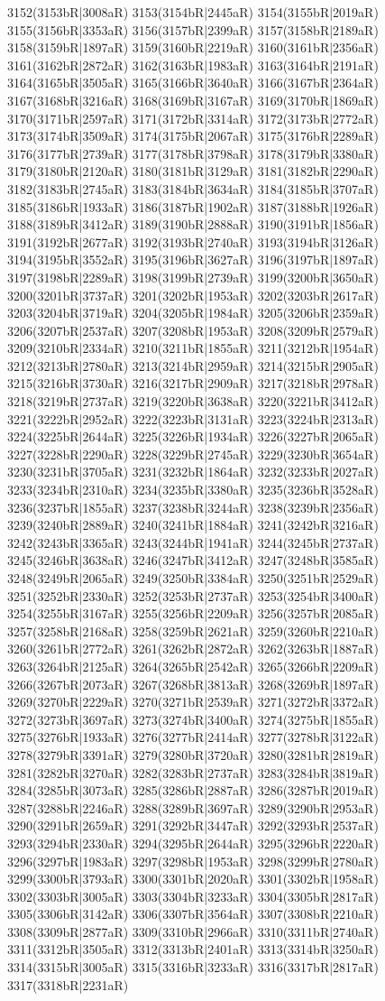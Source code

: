 3152(3153bR|3008aR) 3153(3154bR|2445aR) 3154(3155bR|2019aR) 3155(3156bR|3353aR) 3156(3157bR|2399aR) 3157(3158bR|2189aR) 3158(3159bR|1897aR) 3159(3160bR|2219aR) 3160(3161bR|2356aR) 3161(3162bR|2872aR) 3162(3163bR|1983aR) 3163(3164bR|2191aR) 3164(3165bR|3505aR) 3165(3166bR|3640aR) 3166(3167bR|2364aR) 3167(3168bR|3216aR) 3168(3169bR|3167aR) 3169(3170bR|1869aR) 3170(3171bR|2597aR) 3171(3172bR|3314aR) 3172(3173bR|2772aR) 3173(3174bR|3509aR) 3174(3175bR|2067aR) 3175(3176bR|2289aR) 3176(3177bR|2739aR) 3177(3178bR|3798aR) 3178(3179bR|3380aR) 3179(3180bR|2120aR) 3180(3181bR|3129aR) 3181(3182bR|2290aR) 3182(3183bR|2745aR) 3183(3184bR|3634aR) 3184(3185bR|3707aR) 3185(3186bR|1933aR) 3186(3187bR|1902aR) 3187(3188bR|1926aR) 3188(3189bR|3412aR) 3189(3190bR|2888aR) 3190(3191bR|1856aR) 3191(3192bR|2677aR) 3192(3193bR|2740aR) 3193(3194bR|3126aR) 3194(3195bR|3552aR) 3195(3196bR|3627aR) 3196(3197bR|1897aR) 3197(3198bR|2289aR) 3198(3199bR|2739aR) 3199(3200bR|3650aR) 3200(3201bR|3737aR) 3201(3202bR|1953aR) 3202(3203bR|2617aR) 3203(3204bR|3719aR) 3204(3205bR|1984aR) 3205(3206bR|2359aR) 3206(3207bR|2537aR) 3207(3208bR|1953aR) 3208(3209bR|2579aR) 3209(3210bR|2334aR) 3210(3211bR|1855aR) 3211(3212bR|1954aR) 3212(3213bR|2780aR) 3213(3214bR|2959aR) 3214(3215bR|2905aR) 3215(3216bR|3730aR) 3216(3217bR|2909aR) 3217(3218bR|2978aR) 3218(3219bR|2737aR) 3219(3220bR|3638aR) 3220(3221bR|3412aR) 3221(3222bR|2952aR) 3222(3223bR|3131aR) 3223(3224bR|2313aR) 3224(3225bR|2644aR) 3225(3226bR|1934aR) 3226(3227bR|2065aR) 3227(3228bR|2290aR) 3228(3229bR|2745aR) 3229(3230bR|3654aR) 3230(3231bR|3705aR) 3231(3232bR|1864aR) 3232(3233bR|2027aR) 3233(3234bR|2310aR) 3234(3235bR|3380aR) 3235(3236bR|3528aR) 3236(3237bR|1855aR) 3237(3238bR|3244aR) 3238(3239bR|2356aR) 3239(3240bR|2889aR) 3240(3241bR|1884aR) 3241(3242bR|3216aR) 3242(3243bR|3365aR) 3243(3244bR|1941aR) 3244(3245bR|2737aR) 3245(3246bR|3638aR) 3246(3247bR|3412aR) 3247(3248bR|3585aR) 3248(3249bR|2065aR) 3249(3250bR|3384aR) 3250(3251bR|2529aR) 3251(3252bR|2330aR) 3252(3253bR|2737aR) 3253(3254bR|3400aR) 3254(3255bR|3167aR) 3255(3256bR|2209aR) 3256(3257bR|2085aR) 3257(3258bR|2168aR) 3258(3259bR|2621aR) 3259(3260bR|2210aR) 3260(3261bR|2772aR) 3261(3262bR|2872aR) 3262(3263bR|1887aR) 3263(3264bR|2125aR) 3264(3265bR|2542aR) 3265(3266bR|2209aR) 3266(3267bR|2073aR) 3267(3268bR|3813aR) 3268(3269bR|1897aR) 3269(3270bR|2229aR) 3270(3271bR|2539aR) 3271(3272bR|3372aR) 3272(3273bR|3697aR) 3273(3274bR|3400aR) 3274(3275bR|1855aR) 3275(3276bR|1933aR) 3276(3277bR|2414aR) 3277(3278bR|3122aR) 3278(3279bR|3391aR) 3279(3280bR|3720aR) 3280(3281bR|2819aR) 3281(3282bR|3270aR) 3282(3283bR|2737aR) 3283(3284bR|3819aR) 3284(3285bR|3073aR) 3285(3286bR|2887aR) 3286(3287bR|2019aR) 3287(3288bR|2246aR) 3288(3289bR|3697aR) 3289(3290bR|2953aR) 3290(3291bR|2659aR) 3291(3292bR|3447aR) 3292(3293bR|2537aR) 3293(3294bR|2330aR) 3294(3295bR|2644aR) 3295(3296bR|2220aR) 3296(3297bR|1983aR) 3297(3298bR|1953aR) 3298(3299bR|2780aR) 3299(3300bR|3793aR) 3300(3301bR|2020aR) 3301(3302bR|1958aR) 3302(3303bR|3005aR) 3303(3304bR|3233aR) 3304(3305bR|2817aR) 3305(3306bR|3142aR) 3306(3307bR|3564aR) 3307(3308bR|2210aR) 3308(3309bR|2877aR) 3309(3310bR|2966aR) 3310(3311bR|2740aR) 3311(3312bR|3505aR) 3312(3313bR|2401aR) 3313(3314bR|3250aR) 3314(3315bR|3005aR) 3315(3316bR|3233aR) 3316(3317bR|2817aR) 3317(3318bR|2231aR) 